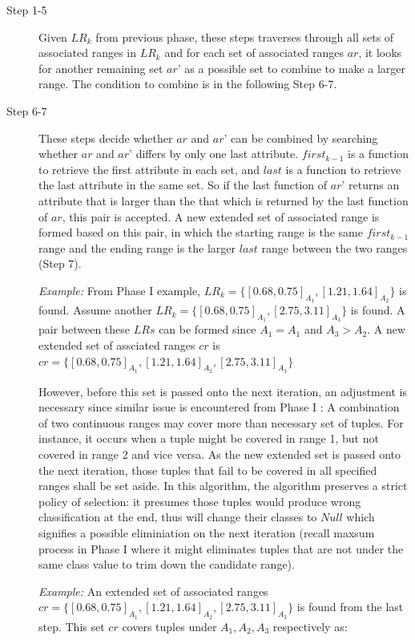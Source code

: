 \begin{description}
\item[Step 1-5] Given $LR_k$ from previous phase, these steps traverses through all sets of associated ranges in $LR_k$ and for each set of associated ranges $ar$, it looks for another remaining set $ar’$ as a possible set to combine to make a larger range. The condition to combine is in the following Step 6-7. 

\item[Step 6-7] These steps decide whether $ar$ and $ar’$ can be combined by searching whether $ar$ and $ar’$ differs by only one last attribute. $first_{k-1}$ is a function to retrieve the first attribute in each set, and $last$ is a function to retrieve the last attribute in the same set. So if the last function of $ar’$ returns an attribute that is larger than the that which is returned by the last function of $ar$, this pair is accepted. A new extended set of associated range is formed based on this pair, in which the starting range is the same $first_{k-1}$ range and the ending range is the larger $last$ range between the two ranges (Step 7). 

\textit{Example: } From Phase I example, $LR_k = \{[0.68, 0.75]_{A_1}, [1.21,1.64]_{A_2}\}$ is found. Assume another $LR_k = \{[0.68, 0.75]_{A_1}, [2.75,3.11]_{A_3}\}$ is found. A pair between these $LRs$ can be formed since $A_1 = A_1$ and $A_3 > A_2$. A new extended set of assciated ranges $cr$ is
$cr = \{[0.68, 0.75]_{A_1}, [1.21,1.64]_{A_2}, [2.75,3.11]_{A_3}\}$

However, before this set is passed onto the next iteration, an adjustment is necessary since similar issue is encountered from Phase I : A combination of two continuous ranges may cover more than necessary set of tuples. For instance, it occurs when a tuple might be covered in range 1, but not covered in range 2 and vice versa. As the new extended set is passed onto the next iteration, those tuples that fail to be covered in all specified ranges shall be set aside. In this algorithm, the algorithm preserves a strict policy of selection: it presumes those tuples would produce wrong classification at the end, thus will change their classes to $Null$ which signifies a possible eliminiation on the next iteration (recall maxsum process in Phase I where it might eliminates tuples that are not under the same class value to trim down the candidate range).

\textit{Example: } An extended set of associated ranges $cr = \{[0.68, 0.75]_{A_1}, [1.21,1.64]_{A_2}, [2.75,3.11]_{A_3}\}$ is found from the last step. This set $cr$ covers tuples under $A_1, A_2, A_3$ respectively as:


\end{description}

